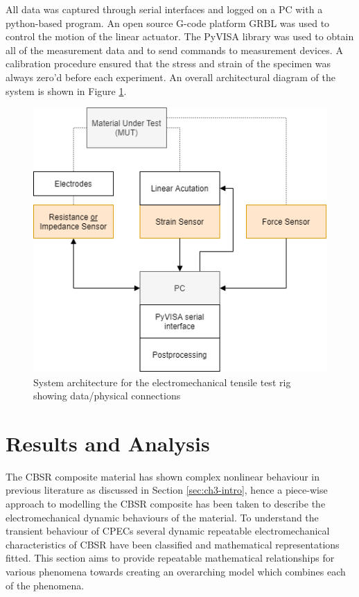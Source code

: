 All data was captured through serial interfaces and logged on a PC with a python-based program. An open source G-code platform GRBL was used to control the motion of the linear actuator. The PyVISA library was used to obtain all of the measurement data and to send commands to measurement devices. A calibration procedure ensured that the stress and strain of the specimen was always zero'd before each experiment. An overall architectural diagram of the system is shown in Figure \ref{fig:electromech-architecture}.
\begin{figure}[H]
	\centering
	\includegraphics[width=0.7\linewidth]{Figures/Electromech_tester.png}
	\caption{System architecture for the electromechanical tensile test rig showing data/physical connections}
	\label{fig:electromech-architecture}
\end{figure}


\section{Results and Analysis}
The CBSR composite material has shown complex nonlinear behaviour in previous literature as discussed in Section \ref{sec:ch3-intro}, hence a piece-wise approach to modelling the CBSR composite has been taken to describe the electromechanical dynamic behaviours of the material. To understand the transient behaviour of CPECs several dynamic repeatable electromechanical characteristics of CBSR have been classified and mathematical representations fitted. This section aims to provide repeatable mathematical relationships for various phenomena towards creating an overarching model which combines each of the phenomena.


